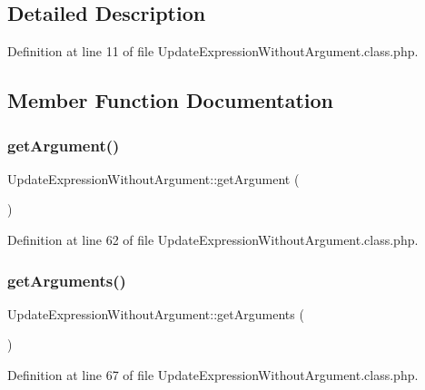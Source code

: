 \subsection{Detailed Description}


Definition at line 11 of file Update\+Expression\+Without\+Argument.\+class.\+php.



\subsection{Member Function Documentation}
\mbox{\label{classUpdateExpressionWithoutArgument_a6b1b1611de45acf42d4a10f71343de38}} 
\subsubsection{\texorpdfstring{get\+Argument()}{getArgument()}}
{\footnotesize\ttfamily Update\+Expression\+Without\+Argument\+::get\+Argument (\begin{DoxyParamCaption}{ }\end{DoxyParamCaption})}



Definition at line 62 of file Update\+Expression\+Without\+Argument.\+class.\+php.

\mbox{\label{classUpdateExpressionWithoutArgument_ae196b9aa4c42acda72b3ec725b1b7bed}} 
\subsubsection{\texorpdfstring{get\+Arguments()}{getArguments()}}
{\footnotesize\ttfamily Update\+Expression\+Without\+Argument\+::get\+Arguments (\begin{DoxyParamCaption}{ }\end{DoxyParamCaption})}



Definition at line 67 of file Update\+Expression\+Without\+Argument.\+class.\+php.

